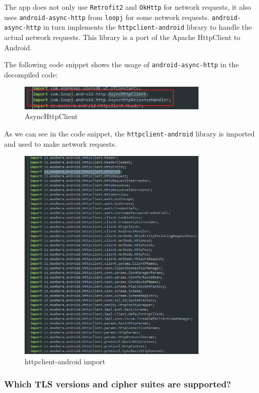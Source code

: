 \documentclass[12pt,a4paper]{article}
\begin{document}
The app does not only use \texttt{Retrofit2} and \texttt{OkHttp} for network requests, it also uses \texttt{android-async-http} from \texttt{loopj} for some network requests.
\texttt{android-async-http} in turn implements the \texttt{httpclient-android} library to handle the actual network requests. This library is a port of the Apache HttpClient to Android.

The following code snippet shows the usage of \texttt{android-async-http} in the decompiled code:

\begin{figure}[H]
\centering
\includegraphics[width=0.8\textwidth]{./screenshots/asyncHttpClient.png}
\caption{AsyncHttpClient}
\end{figure}

As we can see in the code snippet, the \texttt{httpclient-android} library is imported and used to make network requests.

\begin{figure}[H]
\centering
\includegraphics[width=0.8\textwidth]{./screenshots/msebera_http.png}
\caption{httpclient-android import}
\end{figure}


\subsubsection{Which TLS versions and cipher suites are supported?}
\end{document}
